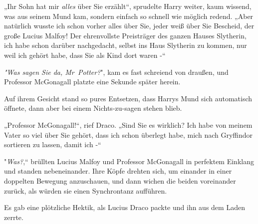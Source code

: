 „Ihr Sohn hat mir \emph{alles} über Sie erzählt“, sprudelte Harry weiter, kaum wissend, was aus seinem Mund kam, sondern einfach so schnell wie möglich redend. „Aber natürlich wusste ich schon vorher alles über Sie, jeder weiß über Sie Bescheid, der große Lucius Malfoy! Der ehrenvollste Preisträger des ganzen Hauses Slytherin, ich habe schon darüber nachgedacht, selbst ins Haus Slytherin zu kommen, nur weil ich gehört habe, dass Sie als Kind dort waren -“

\emph{"Was sagen Sie da, Mr~Potter?}", kam es fast schreiend von draußen, und Professor McGonagall platzte eine Sekunde später herein.

Auf ihrem Gesicht stand so pures Entsetzen, dass Harrys Mund sich automatisch öffnete, dann aber bei einem Nichts-zu-sagen stehen blieb.

„Professor McGonagall!“, rief Draco. „Sind Sie es wirklich? Ich habe von meinem Vater so viel über Sie gehört, dass ich schon überlegt habe, mich nach Gryffindor sortieren zu lassen, damit ich -“


"\emph{Was?},“ brüllten Lucius Malfoy und Professor McGonagall in perfektem Einklang und standen nebeneinander. Ihre Köpfe drehten sich, um einander in einer doppelten Bewegung anzuschauen, und dann wichen die beiden voreinander zurück, als würden sie einen Synchrontanz aufführen.

Es gab eine plötzliche Hektik, als Lucius Draco packte und ihn aus dem Laden zerrte.

